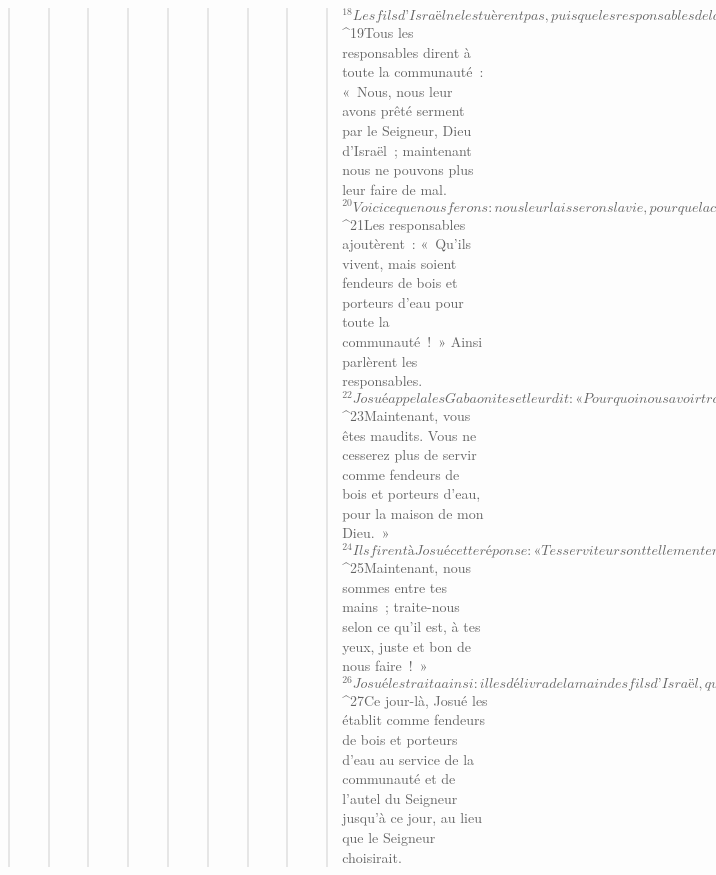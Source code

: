 \begin{verse}
\begin{verse}
\begin{verse}
\begin{verse}
\begin{verse}
\begin{verse}
\begin{verse}
\begin{verse}
\begin{verse}
${}^{18}Les fils d’Israël ne les tuèrent pas, puisque les responsables de la communauté leur avaient fait ce serment par le Seigneur, Dieu d’Israël. Mais toute la communauté récrimina contre les responsables.
${}^{19}Tous les responsables dirent à toute la communauté : « Nous, nous leur avons prêté serment par le Seigneur, Dieu d’Israël ; maintenant nous ne pouvons plus leur faire de mal. 
${}^{20}Voici ce que nous ferons : nous leur laisserons la vie, pour que la colère de Dieu ne nous atteigne pas à cause du serment que nous leur avons fait. » 
${}^{21}Les responsables ajoutèrent : « Qu’ils vivent, mais soient fendeurs de bois et porteurs d’eau pour toute la communauté ! » Ainsi parlèrent les responsables.
${}^{22}Josué appela les Gabaonites et leur dit : « Pourquoi nous avoir trompés en disant “Nous habitons très loin”, alors que vous habitez au milieu de nous ? 
${}^{23}Maintenant, vous êtes maudits. Vous ne cesserez plus de servir comme fendeurs de bois et porteurs d’eau, pour la maison de mon Dieu. » 
${}^{24}Ils firent à Josué cette réponse : « Tes serviteurs ont tellement entendu que le Seigneur ton Dieu avait ordonné à son serviteur Moïse de vous livrer tout le pays et d’exterminer tous ses habitants devant vous que, devant vous, nous avons eu très peur pour nos vies ; c’est pourquoi nous avons agi de la sorte. 
${}^{25}Maintenant, nous sommes entre tes mains ; traite-nous selon ce qu’il est, à tes yeux, juste et bon de nous faire ! » 
${}^{26}Josué les traita ainsi : il les délivra de la main des fils d’Israël, qui ne les tuèrent pas. 
${}^{27}Ce jour-là, Josué les établit comme fendeurs de bois et porteurs d’eau au service de la communauté et de l’autel du Seigneur jusqu’à ce jour, au lieu que le Seigneur choisirait.
      

\end{verse}
\end{verse}
\end{verse}
\end{verse}
\end{verse}
\end{verse}
\end{verse}
\end{verse}
\end{verse}
